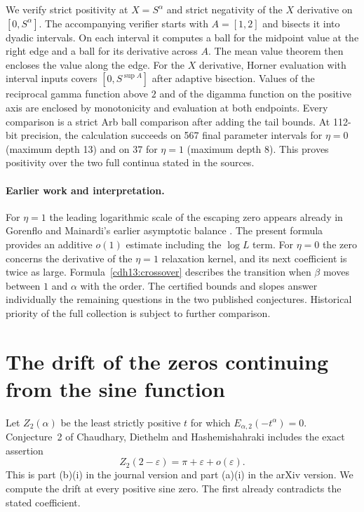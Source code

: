 \documentclass[11pt,a4paper]{article}
\numberwithin{equation}{section}
\begin{document}
We verify strict positivity at $X=S^\alpha$ and strict negativity
of the $X$ derivative on $[0,S^\alpha]$. The accompanying verifier
starts with $A=[1,2]$ and bisects it into dyadic intervals. On each
interval it computes a ball for the midpoint value at the right edge
and a ball for its derivative across $A$. The mean value theorem then
encloses the value along the edge. For the $X$ derivative, Horner
evaluation with interval inputs covers $[0,S^{\sup A}]$ after adaptive
bisection. Values of the reciprocal gamma function above $2$ and
of the digamma function on the positive axis are enclosed by monotonicity
and evaluation at both endpoints. Every comparison is a strict Arb
ball comparison after adding the tail bounds. At 112-bit precision,
the calculation succeeds on 567 final parameter intervals for $\eta=0$
(maximum depth 13) and on 37 for $\eta=1$ (maximum depth 8). This
proves positivity over the two full continua stated in the sources.

\paragraph{Earlier work and interpretation.}
For $\eta=1$ the leading logarithmic scale of the escaping zero
appears already in Gorenflo and Mainardi's earlier asymptotic balance
\cite[Section~3.2, Eq.~(3.36)]{GM}.
The present formula provides an additive $o(1)$ estimate including
the $\log L$ term. For $\eta=0$ the zero concerns the derivative of
the $\eta=1$ relaxation kernel, and its next coefficient is twice
as large. Formula~\eqref{cdh13:crossover} describes the transition
when $\beta$ moves between $1$ and $\alpha$ with the order. The certified bounds and slopes answer individually the
remaining questions in the two published conjectures. Historical
priority of the full collection is subject to further comparison.


\section{The drift of the zeros continuing from the sine function}
\label{sec:drift}
Let $Z_2(\alpha)$ be the least strictly positive $t$ for which
$E_{\alpha,2}(-t^\alpha)=0$. Conjecture~2 of Chaudhary, Diethelm and
Hashemishahraki \cite{CDH} includes the exact assertion
\[
 Z_2(2-\varepsilon)=\pi+\varepsilon+o(\varepsilon).
\]
This is part (b)(i) in the journal version and part (a)(i) in the arXiv version. We compute the drift at every
positive sine zero. The first already contradicts the stated coefficient.
\end{document}
